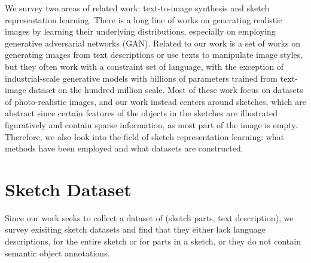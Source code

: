 
We survey two areas of related work:  text-to-image synthesis and sketch representation learning. There is a long line of works on generating realistic images by learning their underlying distributions, especially on employing generative adversarial networks (GAN). 
Related to our work is a set of works on generating images from text descriptions or use texts to manipulate image styles, but they often work with a constraint set of language, with the exception of industrial-scale generative models with billions of parameters trained from text-image dataset on the hundred million scale. %
Most of these work focus on datasets of photo-realistic images, and our work instead centers around sketches, which are abstract since certain features of the objects in the sketches are illustrated figuratively and contain sparse information, as most part of the image is empty. 
Therefore, we also look into the field of sketch representation learning: what methods have been employed and what datasets are constructed.   




\section{Sketch Dataset}
Since our work seeks to collect a dataset of (sketch parts, text description), we survey exisiting sketch datasets and find that they either lack language descriptions, for the entire sketch or for parts in a sketch, or they do not contain semantic object annotations. 

